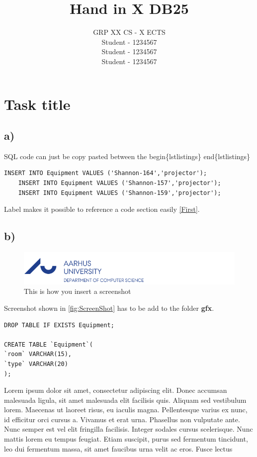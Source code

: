 \documentclass[twoside, a4paper, 11pt]{article}
\newcommand{\StudA}{\small Student - 1234567}
\newcommand{\StudB}{\small Student - 1234567}
\newcommand{\StudC}{\small Student - 1234567}
\newcommand{\GRP}{ GRP XX}
\newcommand{\study}{ CS - X ECTS}
\newcommand{\groupinfo}{\GRP \study \\ \StudA\\ \StudB\\ \StudC\\}
\begin{document}
	
	\title{Hand in X DB25} %
	\author{ \groupinfo}
	\date{}
	\maketitle
	\thispagestyle{empty}

\section{Task title}
\subsection*{a)}
SQL code can just be copy pasted between the begin\{lstlistings\} end\{lstlistings\}
\begin{lstlisting}[label=First, caption={SQL code}]
	INSERT INTO Equipment VALUES ('Shannon-164','projector');
	INSERT INTO Equipment VALUES ('Shannon-157','projector');
	INSERT INTO Equipment VALUES ('Shannon-159','projector');
\end{lstlisting}

\noindent
Label makes it possible to reference a code section easily \autoref{First}. 

\subsection*{b)}

\begin{figure}[h]
	\centering
	\includegraphics[width=1\linewidth]{gfx/logo}
	\caption{This is how you insert a screenshot} %
	\label{fig:ScreenShot}
\end{figure}

\noindent
Screenshot shown in \autoref{fig:ScreenShot} has to be add to the folder \textbf{gfx}.


\begin{lstlisting}[label=Second]
DROP TABLE IF EXISTS Equipment;

CREATE TABLE `Equipment`(
`room` VARCHAR(15),
`type` VARCHAR(20)
);
\end{lstlisting}
\noindent
Lorem ipsum dolor sit amet, consectetur adipiscing elit. Donec accumsan malesuada ligula, sit amet malesuada elit facilisis quis. Aliquam sed vestibulum lorem. Maecenas ut laoreet risus, eu iaculis magna.  Pellentesque varius ex nunc, id efficitur orci cursus a. Vivamus et erat urna. Phasellus non vulputate ante. Nunc semper est vel elit fringilla facilisis. Integer sodales cursus scelerisque.  Nunc mattis lorem eu tempus feugiat. Etiam suscipit, purus sed fermentum tincidunt, leo dui fermentum massa, sit amet faucibus urna velit ac eros. Fusce lectus 
\end{document}
